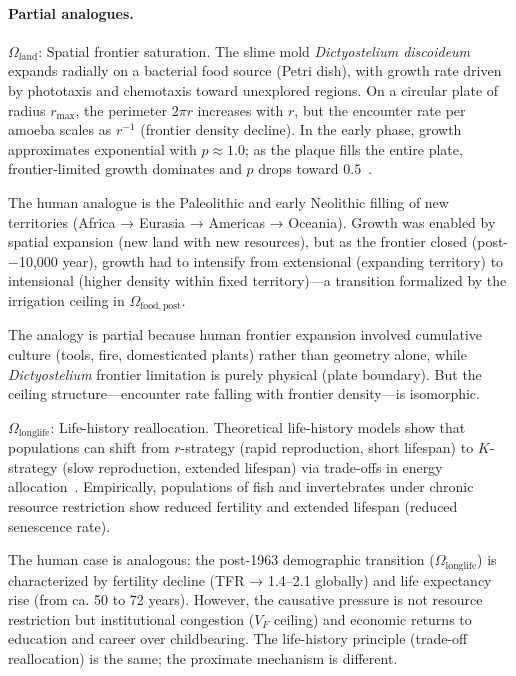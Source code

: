 \documentclass[11pt]{article}
\begin{document}
\paragraph{Partial analogues.}

$\Omega_{\mathrm{land}}$: Spatial frontier saturation.
The slime mold \textit{Dictyostelium discoideum} expands radially on a bacterial food source (Petri dish), with growth rate
driven by phototaxis and chemotaxis toward unexplored regions. On a circular plate of radius $r_{\mathrm{max}}$, the perimeter
$2\pi r$ increases with $r$, but the encounter rate per amoeba scales as $r^{-1}$ (frontier density decline). In the early
phase, growth approximates exponential with $p \approx 1.0$; as the plaque fills the entire plate, frontier-limited
growth dominates and $p$ drops toward $0.5$~\cite{kessin2001}.

The human analogue is the Paleolithic and early Neolithic filling of new territories (Africa → Eurasia → Americas → Oceania).
Growth was enabled by spatial expansion (new land with new resources), but as the frontier closed (post-$-$10,000 year), growth
had to intensify from extensional (expanding territory) to intensional (higher density within fixed territory)---a transition
formalized by the irrigation ceiling in $\Omega_{\mathrm{food,post}}$.

The analogy is partial because human frontier expansion involved cumulative culture (tools, fire, domesticated plants) rather
than geometry alone, while \textit{Dictyostelium} frontier limitation is purely physical (plate boundary). But the ceiling
structure---encounter rate falling with frontier density---is isomorphic.

$\Omega_{\mathrm{longlife}}$: Life-history reallocation.
Theoretical life-history models show that populations can shift from $r$-strategy (rapid reproduction, short lifespan) to
$K$-strategy (slow reproduction, extended lifespan) via trade-offs in energy allocation~\cite{stearns2000}.
Empirically, populations of fish and invertebrates under chronic resource restriction show reduced fertility and extended
lifespan (reduced senescence rate).

The human case is analogous: the post-1963 demographic transition ($\Omega_{\mathrm{longlife}}$) is characterized by fertility
decline (TFR → 1.4--2.1 globally) and life expectancy rise (from ca. 50 to 72 years). However, the causative pressure is not
resource restriction but institutional congestion ($V_F$ ceiling) and economic returns to education and career over childbearing.
The life-history principle (trade-off reallocation) is the same; the proximate mechanism is different.
\end{document}
